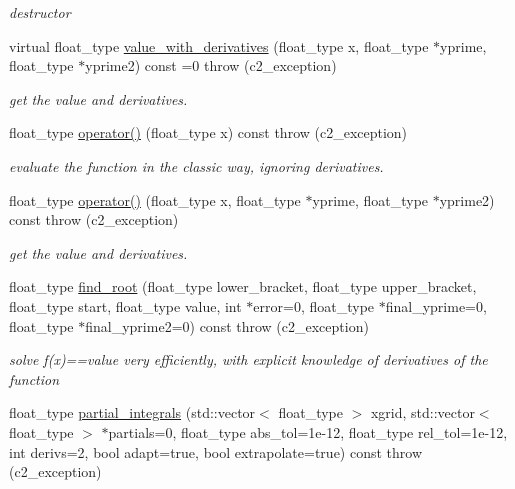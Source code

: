 \begin{DoxyCompactItemize}
\begin{DoxyCompactList}\small\item\em destructor \end{DoxyCompactList}\item 
virtual float\-\_\-type \hyperlink{classc2__function_a44e0201159111350be7f746fc9026f67}{value\-\_\-with\-\_\-derivatives} (float\-\_\-type x, float\-\_\-type $\ast$yprime, float\-\_\-type $\ast$yprime2) const =0  throw (c2\-\_\-exception)
\begin{DoxyCompactList}\small\item\em get the value and derivatives. \end{DoxyCompactList}\item 
float\-\_\-type \hyperlink{classc2__function_a0658cb22966f0ff9072d4d0e04b54c61}{operator()} (float\-\_\-type x) const   throw (c2\-\_\-exception)
\begin{DoxyCompactList}\small\item\em evaluate the function in the classic way, ignoring derivatives. \end{DoxyCompactList}\item 
float\-\_\-type \hyperlink{classc2__function_a25c89b64e6cbd749314d0a61063240cc}{operator()} (float\-\_\-type x, float\-\_\-type $\ast$yprime, float\-\_\-type $\ast$yprime2) const   throw (c2\-\_\-exception)
\begin{DoxyCompactList}\small\item\em get the value and derivatives. \end{DoxyCompactList}\item 
float\-\_\-type \hyperlink{classc2__function_acd17a7191226578c866d82cb2e9ff89f}{find\-\_\-root} (float\-\_\-type lower\-\_\-bracket, float\-\_\-type upper\-\_\-bracket, float\-\_\-type start, float\-\_\-type value, int $\ast$error=0, float\-\_\-type $\ast$final\-\_\-yprime=0, float\-\_\-type $\ast$final\-\_\-yprime2=0) const   throw (c2\-\_\-exception)
\begin{DoxyCompactList}\small\item\em solve f(x)==value very efficiently, with explicit knowledge of derivatives of the function \end{DoxyCompactList}\item 
float\-\_\-type \hyperlink{classc2__function_a89ce5e2f44ebfaf9eb4d66605cde4fde}{partial\-\_\-integrals} (std\-::vector$<$ float\-\_\-type $>$ xgrid, std\-::vector$<$ float\-\_\-type $>$ $\ast$partials=0, float\-\_\-type abs\-\_\-tol=1e-\/12, float\-\_\-type rel\-\_\-tol=1e-\/12, int derivs=2, bool adapt=true, bool extrapolate=true) const   throw (c2\-\_\-exception)

\end{DoxyCompactItemize}
